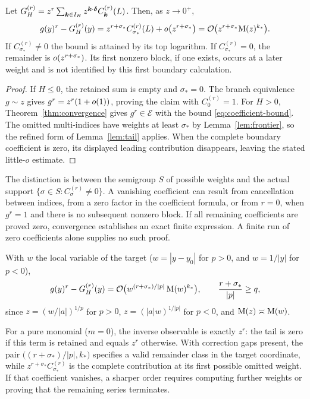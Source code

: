 \begin{theorem}
\label{thm:remainder}
Let $G^{(r)}_H=z^r\sum_{\boldsymbol k\in I_H}z^{\boldsymbol k\cdot\boldsymbol\delta}C^{(r)}_{\boldsymbol k}(L)$. Then, as $z\to0^+$,
\begin{equation}
 g(y)^r-G^{(r)}_H(y)=z^{r+\sigma_*}C^{(r)}_{\sigma_*}(L)+o\bigl(z^{r+\sigma_*}\bigr)
 =\mathcal O\bigl(z^{r+\sigma_*}\mathrm M(z)^{k_*}\bigr).
 \label{eq:remainder}
\end{equation}
If $C^{(r)}_{\sigma_*}\ne0$ the bound is attained by its top logarithm.
If $C^{(r)}_{\sigma_*}=0$, the remainder is
$o(z^{r+\sigma_*})$. Its first nonzero block, if one exists, occurs at
a later weight and is not identified by this first boundary calculation.
\end{theorem}
\begin{proof}
If $H\le0$, the retained sum is empty and $\sigma_*=0$.
The branch equivalence $g\sim z$ gives
$g^r=z^r(1+o(1))$, proving the claim with $C^{(r)}_0=1$.
For $H>0$, Theorem~\ref{thm:convergence} gives $g^r\in\mathcal E$
with the bound \eqref{eq:coefficient-bound}. The omitted multi-indices
have weights at least $\sigma_*$ by Lemma~\ref{lem:frontier}, so the
refined form of Lemma~\ref{lem:tail} applies. When the complete boundary
coefficient is zero, its displayed leading contribution disappears, leaving
the stated little-$o$ estimate.
\end{proof}

The distinction is between the semigroup $S$ of possible weights and the
actual support $\{\sigma\in S:C^{(r)}_\sigma\ne0\}$. A vanishing
coefficient can result from cancellation between indices, from a zero
factor in the coefficient formula, or from $r=0$, when $g^r=1$ and there
is no subsequent nonzero block. If all remaining coefficients are proved
zero, convergence establishes an exact finite expression. A finite run of
zero coefficients alone supplies no such proof.

\begin{corollary}
\label{cor:remainder-y}
With $w$ the local variable of the target ($w=|y-y_0|$ for $p>0$,
and $w=1/|y|$ for $p<0$),
\[
 g(y)^r-G^{(r)}_H(y)=\mathcal O\bigl(w^{(r+\sigma_*)/|p|}\,\mathrm M(w)^{k_*}\bigr),\qquad\frac{r+\sigma_*}{|p|}\ge q ,
\]
since $z=(w/|a|)^{1/p}$ for $p>0$, $z=(|a|w)^{1/|p|}$ for $p<0$, and $\mathrm M(z)\asymp\mathrm M(w)$.
\end{corollary}

For a pure monomial ($m=0$), the inverse observable is exactly $z^r$: the tail is zero if this term is retained and equals $z^r$ otherwise. With correction gaps present, the pair $\bigl((r+\sigma_*)/|p|,k_*\bigr)$ specifies a valid remainder class in the target coordinate, while $z^{r+\sigma_*}C^{(r)}_{\sigma_*}$ is the complete contribution at its first possible omitted weight. If that coefficient vanishes, a sharper order requires computing further weights or proving that the remaining series terminates.

